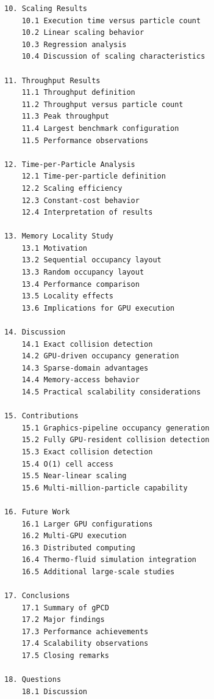 \begin{verbatim}
10. Scaling Results
    10.1 Execution time versus particle count
    10.2 Linear scaling behavior
    10.3 Regression analysis
    10.4 Discussion of scaling characteristics

11. Throughput Results
    11.1 Throughput definition
    11.2 Throughput versus particle count
    11.3 Peak throughput
    11.4 Largest benchmark configuration
    11.5 Performance observations

12. Time-per-Particle Analysis
    12.1 Time-per-particle definition
    12.2 Scaling efficiency
    12.3 Constant-cost behavior
    12.4 Interpretation of results

13. Memory Locality Study
    13.1 Motivation
    13.2 Sequential occupancy layout
    13.3 Random occupancy layout
    13.4 Performance comparison
    13.5 Locality effects
    13.6 Implications for GPU execution

14. Discussion
    14.1 Exact collision detection
    14.2 GPU-driven occupancy generation
    14.3 Sparse-domain advantages
    14.4 Memory-access behavior
    14.5 Practical scalability considerations

15. Contributions
    15.1 Graphics-pipeline occupancy generation
    15.2 Fully GPU-resident collision detection
    15.3 Exact collision detection
    15.4 O(1) cell access
    15.5 Near-linear scaling
    15.6 Multi-million-particle capability

16. Future Work
    16.1 Larger GPU configurations
    16.2 Multi-GPU execution
    16.3 Distributed computing
    16.4 Thermo-fluid simulation integration
    16.5 Additional large-scale studies

17. Conclusions
    17.1 Summary of gPCD
    17.2 Major findings
    17.3 Performance achievements
    17.4 Scalability observations
    17.5 Closing remarks

18. Questions
    18.1 Discussion

\end{verbatim}

